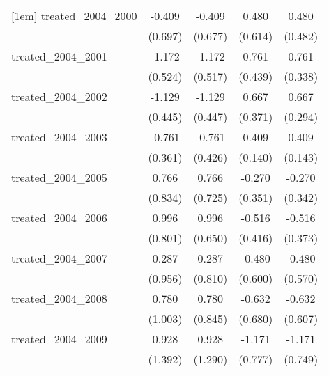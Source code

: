 {\begin{tabular}{l*{4}{c}}
[1em]
treated\_2004\_2000&      -0.409         &      -0.409         &       0.480         &       0.480         \\
            &     (0.697)         &     (0.677)         &     (0.614)         &     (0.482)         \\
[1em]
treated\_2004\_2001&      -1.172\sym{*}  &      -1.172\sym{*}  &       0.761         &       0.761\sym{*}  \\
            &     (0.524)         &     (0.517)         &     (0.439)         &     (0.338)         \\
[1em]
treated\_2004\_2002&      -1.129\sym{*}  &      -1.129\sym{*}  &       0.667         &       0.667\sym{*}  \\
            &     (0.445)         &     (0.447)         &     (0.371)         &     (0.294)         \\
[1em]
treated\_2004\_2003&      -0.761\sym{*}  &      -0.761         &       0.409\sym{**} &       0.409\sym{**} \\
            &     (0.361)         &     (0.426)         &     (0.140)         &     (0.143)         \\
[1em]
treated\_2004\_2005&       0.766         &       0.766         &      -0.270         &      -0.270         \\
            &     (0.834)         &     (0.725)         &     (0.351)         &     (0.342)         \\
[1em]
treated\_2004\_2006&       0.996         &       0.996         &      -0.516         &      -0.516         \\
            &     (0.801)         &     (0.650)         &     (0.416)         &     (0.373)         \\
[1em]
treated\_2004\_2007&       0.287         &       0.287         &      -0.480         &      -0.480         \\
            &     (0.956)         &     (0.810)         &     (0.600)         &     (0.570)         \\
[1em]
treated\_2004\_2008&       0.780         &       0.780         &      -0.632         &      -0.632         \\
            &     (1.003)         &     (0.845)         &     (0.680)         &     (0.607)         \\
[1em]
treated\_2004\_2009&       0.928         &       0.928         &      -1.171         &      -1.171         \\
            &     (1.392)         &     (1.290)         &     (0.777)         &     (0.749)         \\

\end{tabular}}
